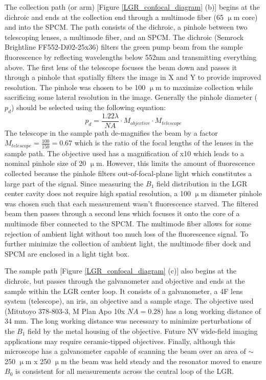 The collection path (or arm) [Figure \ref{LGR_confocal_diagram} (b)] begins at the dichroic and ends at the collection end through a multimode fiber (65 $\upmu$m core) and into the SPCM. The path consists of the dichroic, a pinhole between two telescoping lenses, a multimode fiber, and an SPCM. The dichroic (Semrock Brightline FF552-Di02-25x36) filters the green pump beam from the sample fluorescence by reflecting wavelengths below 552nm and transmitting everything above. The first lens of the telescope focuses the beam down and passes it through a pinhole that spatially filters the image in X and Y to provide improved resolution. The pinhole was chosen to be 100 $\upmu$m to maximize collection while sacrificing some lateral resolution in the image. Generally the pinhole diameter ($p_d$) should be selected using the following equation:
\begin{equation}
p_d = \frac{1.22 \lambda}{NA} \cdot M_{objective} \cdot M_{telescope} 
\end{equation}
The telescope in the sample path de-magnifies the beam by a factor $M_{telescope} = \frac{100}{150} = 0.67$ which is the ratio of the focal lengths of the lenses in the sample path. The objective used has a magnification of x10 which leads to a nominal pinhole size of 20 $\upmu$m. However, this limits the amount of fluorescence collected because the pinhole filters out-of-focal-plane light which constitutes a large part of the signal. Since measuring the $B_1$ field distribution in the LGR center cavity does not require high spatial resolution, a 100 $\upmu$m diameter pinhole was chosen such that each measurement wasn't fluorescence starved. The filtered beam then passes through a second lens which focuses it onto the core of a multimode fiber connected to the SPCM. The multimode fiber allows for some rejection of ambient light without too much loss of the fluorescence signal. To further minimize the collection of ambient light, the multimode fiber dock and SPCM are enclosed in a light tight box. 

The sample path [Figure \ref{LGR_confocal_diagram} (c)] also begins at the dichroic, but passes through the galvanometer and objective and ends at the sample within the LGR center loop. It consists of a galvanometer, a 4F lens system (telescope), an iris, an objective and a sample stage. The objective used (Mitutoyo 378-803-3, M Plan Apo 10x $NA=0.28$) has a long working distance of 34 mm. The long working distance was necessary to minimize perturbations of the $B_1$ field by the metal housing of the objective. Future NV wide-field imaging applications may require ceramic-tipped objectives. Finally, although this microscope has a galvanometer capable of scanning the beam over an area of $\sim$ 250 $\upmu$m x 250 $\upmu$m the beam was held steady and the resonator moved to ensure $B_0$ is consistent for all measurements across the central loop of the LGR.


